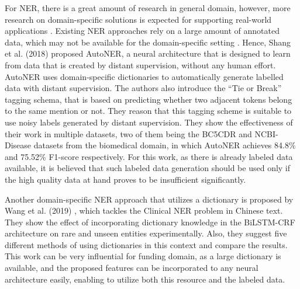 \documentclass{report}
\theoremstyle{definition}
\theoremstyle{remark}
\begin{document}
For NER, there is a great amount of research in general domain, however, more research on domain-specific solutions is expected for supporting real-world applications \cite{quote1}. Existing NER approaches rely on a large amount of annotated data, which may not be available for the domain-specific setting \cite{NERDict2}. Hence, Shang et al. (2018) \cite{NERDict2} proposed AutoNER, a neural architecture that is designed to learn from data that is created by distant supervision, without any human effort. AutoNER uses domain-specific dictionaries to automatically generate labelled data with distant supervision. The authors also introduce the ``Tie or Break'' tagging schema, that is based on predicting whether two adjacent tokens belong to the same mention or not. They reason that this tagging scheme is suitable to use noisy labels generated by distant supervision. They show the effectiveness of their work in multiple datasets, two of them being the BC5CDR \cite{bc5cdr} and NCBI-Disease \cite{ncbi} datasets from the biomedical domain, in which AutoNER achieves 84.8\% and 75.52\% F1-score respectively. For this work, as there is already labeled data available, it is believed that such labeled data generation should be used only if the high quality data at hand proves to be insufficient significantly.

Another domain-specific NER approach that utilizes a dictionary is proposed by Wang et al. (2019) \cite{MedDict}, which tackles the Clinical NER problem in Chinese text. They show the effect of incorporating dictionary knowledge in the BiLSTM-CRF architecture on rare and unseen entities experimentally. Also, they suggest five different methods of using dictionaries in this context and compare the results. This work can be very influential for funding domain, as a large dictionary is available, and the proposed features can be incorporated to any neural architecture easily, enabling to utilize both this resource and the labeled data.
\end{document}
